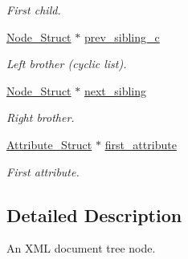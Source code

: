 \begin{DoxyCompactItemize}
\begin{DoxyCompactList}\small\item\em First child. \item\end{DoxyCompactList}\item 
\hypertarget{structphys_1_1xml_1_1Node__Struct_a32219db482f546f0d67946aa164d3533}{
\hyperlink{structphys_1_1xml_1_1Node__Struct}{Node\_\-Struct} $\ast$ \hyperlink{structphys_1_1xml_1_1Node__Struct_a32219db482f546f0d67946aa164d3533}{prev\_\-sibling\_\-c}}
\label{d5/d9c/structphys_1_1xml_1_1Node__Struct_a32219db482f546f0d67946aa164d3533}

\begin{DoxyCompactList}\small\item\em Left brother (cyclic list). \item\end{DoxyCompactList}\item 
\hypertarget{structphys_1_1xml_1_1Node__Struct_a018be7c7d856219b6853a5d1c602a70b}{
\hyperlink{structphys_1_1xml_1_1Node__Struct}{Node\_\-Struct} $\ast$ \hyperlink{structphys_1_1xml_1_1Node__Struct_a018be7c7d856219b6853a5d1c602a70b}{next\_\-sibling}}
\label{d5/d9c/structphys_1_1xml_1_1Node__Struct_a018be7c7d856219b6853a5d1c602a70b}

\begin{DoxyCompactList}\small\item\em Right brother. \item\end{DoxyCompactList}\item 
\hypertarget{structphys_1_1xml_1_1Node__Struct_ad9c345415c8553e8a56020c90a44af18}{
\hyperlink{structphys_1_1xml_1_1Attribute__Struct}{Attribute\_\-Struct} $\ast$ \hyperlink{structphys_1_1xml_1_1Node__Struct_ad9c345415c8553e8a56020c90a44af18}{first\_\-attribute}}
\label{d5/d9c/structphys_1_1xml_1_1Node__Struct_ad9c345415c8553e8a56020c90a44af18}

\begin{DoxyCompactList}\small\item\em First attribute. \item\end{DoxyCompactList}\end{DoxyCompactItemize}


\subsection{Detailed Description}
An XML document tree node. 

